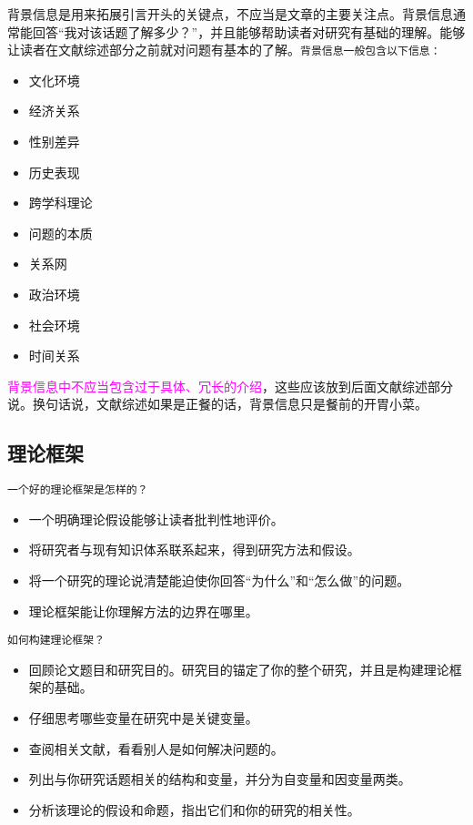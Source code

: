 \documentclass[cn,hazy,blue,14pt,screen]{elegantnote} %
\begin{document}
背景信息是用来拓展引言开头的关键点，不应当是文章的主要关注点。背景信息通常能回答“我对该话题了解多少？”，并且能够帮助读者对研究有基础的理解。能够让读者在文献综述部分之前就对问题有基本的了解。\lstinline{背景信息一般包含以下信息：}

\begin{itemize}
  \item 文化环境
  \item 经济关系
  \item 性别差异
  \item 历史表现
  \item 跨学科理论
  \item 问题的本质
  \item 关系网
  \item 政治环境
  \item 社会环境
  \item 时间关系
\end{itemize}

\textcolor{magenta}{背景信息中不应当包含过于具体、冗长的介绍}，这些应该放到后面文献综述部分说。换句话说，文献综述如果是正餐的话，背景信息只是餐前的开胃小菜。

\subsection{理论框架}

\lstinline{一个好的理论框架是怎样的？}

\begin{itemize}
  \item 一个明确理论假设能够让读者批判性地评价。
  \item 将研究者与现有知识体系联系起来，得到研究方法和假设。
  \item 将一个研究的理论说清楚能迫使你回答“为什么”和“怎么做”的问题。
  \item 理论框架能让你理解方法的边界在哪里。
\end{itemize}

\lstinline{如何构建理论框架？}

\begin{itemize}
  \item 回顾论文题目和研究目的。研究目的锚定了你的整个研究，并且是构建理论框架的基础。
  \item 仔细思考哪些变量在研究中是关键变量。
  \item 查阅相关文献，看看别人是如何解决问题的。
  \item 列出与你研究话题相关的结构和变量，并分为自变量和因变量两类。
  \item 分析该理论的假设和命题，指出它们和你的研究的相关性。
\end{itemize}
\end{document}
